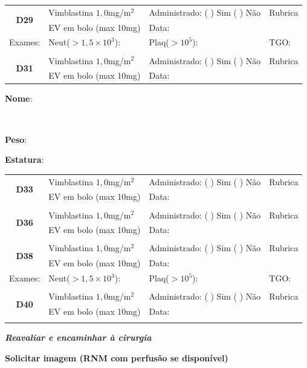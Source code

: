 \documentclass[11pt,a4paper,oldfontcommands]{memoir}
\def\entrywithlabel[#1]#2{\parbox{#1}{{\small #2:} \hrulefill}}
\begin{document}
\begin{center}
\begin{table}[H]
\begin{tabular}{p{1.3cm}p{5cm}|p{5cm}|p{3cm}}
    \\
   \hline
          \multicolumn{1}{c|}{\multirow{2}{*}{\textbf{D29}}}&{Vimblastina \(1,0\)mg/m\(^2\)}&{Administrado: (  ) Sim (  ) Não}&{Rubrica}\\
    \multicolumn{1}{c|}{}&{EV em bolo (max 10mg)}&{Data:}&\\
    \hline
    {Exames:}&{Neut(\(>1,5\times10^3\)):}&{Plaq(\(>10^5\)):}&{TGO:}
    \\
    \hline
    \\
    \hline
    \multicolumn{1}{c|}{\multirow{2}{*}{\textbf{D31}}}&{Vimblastina \(1,0\)mg/m\(^2\)}&{Administrado: (  ) Sim (  ) Não}&{Rubrica}\\
    \multicolumn{1}{c|}{}&{EV em bolo (max 10mg)}&{Data:}&\\
    \hline
\end{tabular}
\end{table}

\pagebreak
    \noindent
\entrywithlabel[1\hsize]{\textbf{Nome}}\hfill
\\[0.3cm]
\entrywithlabel[.45\hsize]{\textbf{Peso}}\hfill  \entrywithlabel[.45\hsize]{\textbf{Estatura}}

\begin{table}[H]
\begin{tabular}{p{1cm}p{5cm}|p{5cm}|p{3cm}}
    \hline
    \multicolumn{1}{c|}{\multirow{2}{*}{\textbf{D33}}}&{Vimblastina \(1,0\)mg/m\(^2\)}&{Administrado: (  ) Sim (  ) Não}&{Rubrica}\\
    \multicolumn{1}{c|}{}&{EV em bolo (max 10mg)}&{Data:}&\\
    \hline
    \\
    \hline
    \multicolumn{1}{c|}{\multirow{2}{*}{\textbf{D36}}}&{Vimblastina \(1,0\)mg/m\(^2\)}&{Administrado: (  ) Sim (  ) Não}&{Rubrica}\\
    \multicolumn{1}{c|}{}&{EV em bolo (max 10mg)}&{Data:}&\\
    \hline
    \\
    \hline
    \multicolumn{1}{c|}{\multirow{2}{*}{\textbf{D38}}}&{Vimblastina \(1,0\)mg/m\(^2\)}&{Administrado: (  ) Sim (  ) Não}&{Rubrica}\\
    \multicolumn{1}{c|}{}&{EV em bolo (max 10mg)}&{Data:}&\\
    \hline
    {Exames:}&{Neut(\(>1,5\times10^3\)):}&{Plaq(\(>10^5\)):}&{TGO:}
    \\
    \hline
    \\
    \hline
    \multicolumn{1}{c|}{\multirow{2}{*}{\textbf{D40}}}&{Vimblastina \(1,0\)mg/m\(^2\)}&{Administrado: (  ) Sim (  ) Não}&{Rubrica}\\
    \multicolumn{1}{c|}{}&{EV em bolo (max 10mg)}&{Data:}&\\
    \hline
    \\
   \hline
\end{tabular}
\end{table}
\textbf{\textit{Reavaliar e encaminhar à cirurgia}}

\textbf{Solicitar imagem (RNM com perfusão se disponível)}
\end{center}
\end{document}
